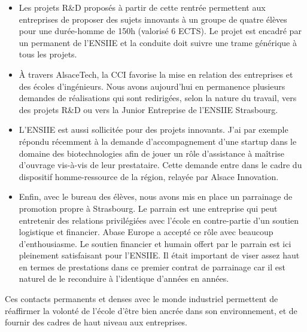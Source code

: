 \documentclass[11pt]{article}
\begin{document}
\begin{itemize}
\item  Les projets  R\&D  proposés  à partir  de  cette  rentrée permettent  aux
  entreprises de proposer des sujets innovants à un groupe de quatre élèves pour
  une  durée-homme de  150h (valorisé  6 ECTS).   Le projet  est encadré  par un
  permanent de  l'ENSIIE et la conduite  doit suivre une trame  générique à tous
  les projets.

\item  \`A  travers  AlsaceTech,  la  CCI  favorise  la  mise  en  relation  des
  entreprises et des écoles d'ingénieurs.   Nous avons aujourd'hui en permanence
  plusieurs demandes  de réalisations  qui sont redirigées,  selon la  nature du
  travail,  vers des  projets  R\&D  ou vers  la  Junior  Entreprise de  l'ENSIIE
  Strasbourg.

\item L'ENSIIE est aussi sollicitée pour des projets innovants. J'ai par exemple
  répondu récemment à la demande  d'accompagnement d'une startup dans le domaine
  des biotechnologies  afin de jouer  un rôle d'assistance à  maîtrise d'ouvrage
  vis-à-vis de leur prestataire. Cette demande entre dans le cadre du dispositif
  homme-ressource de la région, relayée par Alsace Innovation.

\item Enfin, avec le bureau des élèves, nous avons mis en place un parrainage de
  promotion  propre  à Strasbourg.   Le  parrain  est  une entreprise  qui  peut
  entretenir  des  relations privilégiées  avec  l'école  en contre-partie  d'un
  soutien logistique et financier. Abase Europe  a accepté ce rôle avec beaucoup
  d'enthousiasme.  Le soutien financier et humain  offert par le parrain est ici
  pleinement satisfaisant pour l'ENSIIE.  Il était important de viser assez haut
  en termes  de prestations  dans ce  premier contrat de  parrainage car  il est
  naturel de le reconduire à l'identique d'années en années.
  

\end{itemize}

\medskip
Ces  contacts  permanents et  denses  avec  le  monde industriel  permettent  de
réaffirmer la volonté de l'école d'être bien ancrée dans son environnement, et de
fournir des cadres de haut niveau aux entreprises.
\end{document}
